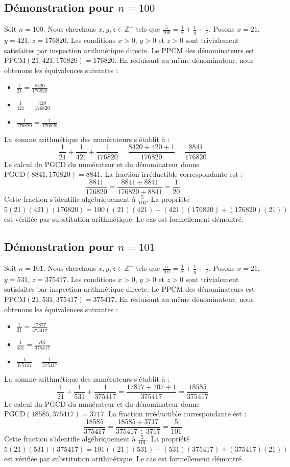 \documentclass[12pt,a4paper]{article}
\begin{document}
\subsection{Démonstration pour $n = 100$}
Soit $n = 100$. Nous cherchons $x, y, z \in \mathbb{Z}^{+}$ tels que $\frac{5}{100} = \frac{1}{x} + \frac{1}{y} + \frac{1}{z}$.
Posons $x = 21$, $y = 421$, $z = 176820$.
Les conditions $x > 0$, $y > 0$ et $z > 0$ sont trivialement satisfaites par inspection arithmétique directe.
Le PPCM des dénominateurs est $\text{PPCM}(21, 421, 176820) = 176820$.
En réduisant au même dénominateur, nous obtenons les équivalences suivantes :
\begin{itemize}
    \item $\frac{1}{21} = \frac{8420}{176820}$
    \item $\frac{1}{421} = \frac{420}{176820}$
    \item $\frac{1}{176820} = \frac{1}{176820}$
\end{itemize}
La somme arithmétique des numérateurs s'établit à :
$$ \frac{1}{21} + \frac{1}{421} + \frac{1}{176820} = \frac{8420 + 420 + 1}{176820} = \frac{8841}{176820} $$
Le calcul du PGCD du numérateur et du dénominateur donne $\text{PGCD}(8841, 176820) = 8841$.
La fraction irréductible correspondante est :
$$ \frac{8841}{176820} = \frac{8841 \div 8841}{176820 \div 8841} = \frac{1}{20} $$
Cette fraction s'identifie algébriquement à $\frac{5}{100}$.
La propriété $5(21)(421)(176820) = 100((21)(421) + (421)(176820) + (176820)(21))$ est vérifiée par substitution arithmétique.
Le cas est formellement démontré.

\subsection{Démonstration pour $n = 101$}
Soit $n = 101$. Nous cherchons $x, y, z \in \mathbb{Z}^{+}$ tels que $\frac{5}{101} = \frac{1}{x} + \frac{1}{y} + \frac{1}{z}$.
Posons $x = 21$, $y = 531$, $z = 375417$.
Les conditions $x > 0$, $y > 0$ et $z > 0$ sont trivialement satisfaites par inspection arithmétique directe.
Le PPCM des dénominateurs est $\text{PPCM}(21, 531, 375417) = 375417$.
En réduisant au même dénominateur, nous obtenons les équivalences suivantes :
\begin{itemize}
    \item $\frac{1}{21} = \frac{17877}{375417}$
    \item $\frac{1}{531} = \frac{707}{375417}$
    \item $\frac{1}{375417} = \frac{1}{375417}$
\end{itemize}
La somme arithmétique des numérateurs s'établit à :
$$ \frac{1}{21} + \frac{1}{531} + \frac{1}{375417} = \frac{17877 + 707 + 1}{375417} = \frac{18585}{375417} $$
Le calcul du PGCD du numérateur et du dénominateur donne $\text{PGCD}(18585, 375417) = 3717$.
La fraction irréductible correspondante est :
$$ \frac{18585}{375417} = \frac{18585 \div 3717}{375417 \div 3717} = \frac{5}{101} $$
Cette fraction s'identifie algébriquement à $\frac{5}{101}$.
La propriété $5(21)(531)(375417) = 101((21)(531) + (531)(375417) + (375417)(21))$ est vérifiée par substitution arithmétique.
Le cas est formellement démontré.
\end{document}
